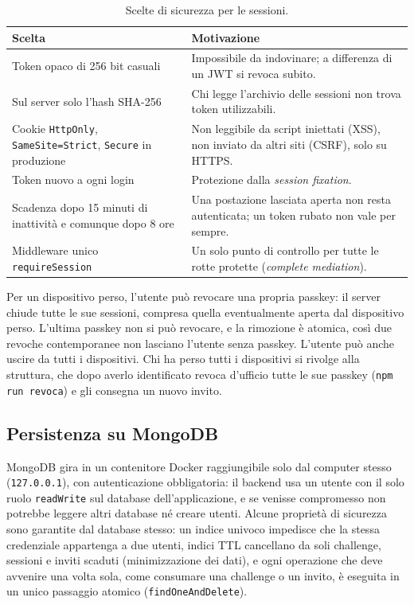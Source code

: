 \begin{table}[H]
\centering\footnotesize
\renewcommand{\arraystretch}{1.15}
\begin{tabular}{@{}p{}p{}@{}}
\toprule
Scelta & Motivazione\\
\midrule
Token opaco di 256 bit casuali & Impossibile da indovinare; a differenza di un JWT si revoca subito.\\
Sul server solo l'hash SHA-256 & Chi legge l'archivio delle sessioni non trova token utilizzabili.\\
Cookie \texttt{HttpOnly}, \texttt{SameSite=Strict}, \texttt{Secure} in produzione & Non leggibile da script iniettati (XSS), non inviato da altri siti (CSRF), solo su HTTPS.\\
Token nuovo a ogni login & Protezione dalla \emph{session fixation}.\\
Scadenza dopo 15 minuti di inattività e comunque dopo 8 ore & Una postazione lasciata aperta non resta autenticata; un token rubato non vale per sempre.\\
Middleware unico \texttt{requireSession} & Un solo punto di controllo per tutte le rotte protette (\emph{complete mediation}).\\
\bottomrule
\end{tabular}
\caption{Scelte di sicurezza per le sessioni.}\label{tab:sessioni}
\end{table}

Per un dispositivo perso, l'utente può revocare una propria passkey: il server chiude tutte le sue sessioni, compresa quella eventualmente aperta dal dispositivo perso. L'ultima passkey non si può revocare, e la rimozione è atomica, così due revoche contemporanee non lasciano l'utente senza passkey. L'utente può anche uscire da tutti i dispositivi. Chi ha perso tutti i dispositivi si rivolge alla struttura, che dopo averlo identificato revoca d'ufficio tutte le sue passkey (\texttt{npm run revoca}) e gli consegna un nuovo invito.

\subsection{Persistenza su MongoDB}\label{sec:fido2-mongo}
MongoDB gira in un contenitore Docker raggiungibile solo dal computer stesso (\texttt{127.0.0.1}), con autenticazione obbligatoria: il backend usa un utente con il solo ruolo \texttt{readWrite} sul database dell'applicazione, e se venisse compromesso non potrebbe leggere altri database né creare utenti. Alcune proprietà di sicurezza sono garantite dal database stesso: un indice univoco impedisce che la stessa credenziale appartenga a due utenti, indici TTL cancellano da soli challenge, sessioni e inviti scaduti (minimizzazione dei dati), e ogni operazione che deve avvenire una volta sola, come consumare una challenge o un invito, è eseguita in un unico passaggio atomico (\texttt{findOneAndDelete}).

